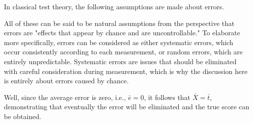 \documentclass{ltjsbook}
\begin{document}


In classical test theory, the following assumptions are made about errors.


All of these can be said to be natural assumptions from the perspective that errors are "effects that appear by chance and are uncontrollable." To elaborate more specifically, errors can be considered as either systematic errors, which occur consistently according to each measurement, or random errors, which are entirely unpredictable. Systematic errors are issues that should be eliminated with careful consideration during measurement, which is why the discussion here is entirely about errors caused by chance.

Well, since the average error is zero, i.e., $\bar{e}=0$, it follows that $\bar{X}=\bar{t}$, demonstrating that eventually the error will be eliminated and the true score can be obtained.
\end{document}
